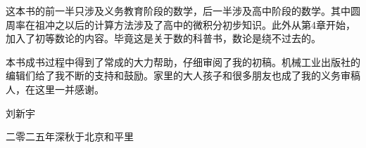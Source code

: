 \documentclass[b5paper]{ctexart}
\begin{document}
这本书的前一半只涉及义务教育阶段的数学，后一半涉及高中阶段的数学。其中圆周率在祖冲之以后的计算方法涉及了高中的微积分初步知识。此外从第4章开始，加入了初等数论的内容。毕竟这是关于数的科普书，数论是绕不过去的。

本书成书过程中得到了常成的大力帮助，仔细审阅了我的初稿。机械工业出版社的编辑们给了我不断的支持和鼓励。家里的大人孩子和很多朋友也成了我的义务审稿人，在这里一并感谢。

\vspace{15mm}

刘新宇

二零二五年深秋于北京和平里


\ifx\wholebook\relax \else

\expandafter\enddocument

\fi
\end{document}
